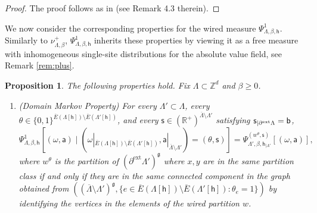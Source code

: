 \documentclass[11pt,a4paper]{article}
\numberwithin{equation}{section}
\theoremstyle{plain}
\newtheorem{Prop}[Thm]{Proposition}
\theoremstyle{definition}
\newcommand\fg{\mathfrak{g}}
\begin{document}
\begin{proof}
    The proof follows as in \cite[Sections~4.2 and 4.3]{gunaratnam2025supercritical} (see Remark 4.3 therein). 
\end{proof}


We now consider the corresponding properties for the wired measure $\Psi^1_{\Lambda,\beta,\mathsf{h}}$. Similarly to $\nu_{\Lambda,\beta}^+$, $\Psi_{\Lambda,\beta,\mathsf{h}}^1$ inherits these properties by viewing it as a free measure with inhomogeneous single-site distributions for the absolute value field, see Remark \ref{rem:plus}.

\begin{Prop}\label{prop: wired random cluster properties} 
The following properties hold. Fix $\Lambda\subset \mathbb Z^d$ and $\beta\geq 0$.
\begin{enumerate}
\item[$\bullet$]\textup{(Domain Markov Property)} For every $\Lambda' \subset \Lambda$, every $\theta\in \{0,1\}^{\overline E(\Lambda[\mathsf{h}]) \setminus \overline E(\Lambda'[\mathsf{h}])}$, and every $\mathsf{s}\in (\mathbb R^+)^{\overline{\Lambda}\setminus\Lambda'}$ satisfying $\mathsf{s}_{|\partial^{\textup{ext}} \Lambda}=\mathsf{b}$,
\begin{equation}
\Psi^{1}_{\Lambda,\beta,\mathsf{h}}[(\omega,\mathsf{a}) \mid (\omega|_{\overline E(\Lambda[\mathsf{h}])\setminus \overline E(\Lambda'[\mathsf{h}])},\mathsf{a}|_{\overline{\Lambda}\setminus \Lambda'})=(\theta,\mathsf{s})]=\Psi^{(w^\theta,\mathsf{s})}_{\Lambda',\beta,\mathsf{h}_{|\Lambda'}}[(\omega,\mathsf{a})],
\end{equation}
where $w^{\theta}$ is the partition of $(\partial^{\mathrm{ext}} \Lambda')^{\fg}$ where $x,y$ are in the same partition class if and only if they are in the same connected component in the graph obtained from  $((\overline{\Lambda}\setminus \Lambda')^{\mathfrak g}, \{ e \in \overline E(\Lambda[\mathsf h])\setminus \overline E(\Lambda'[\mathsf h]):\theta_e=1\})$ by identifying the vertices in the elements of the wired partition $w$. 


\end{enumerate}
\end{Prop}
\end{document}

